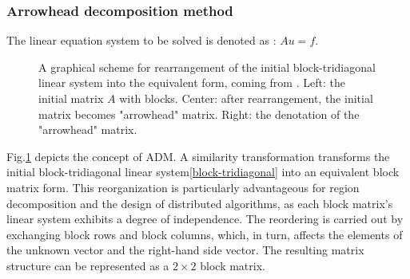 \subsubsection{Arrowhead decomposition method}
The linear equation system to be solved is denoted as : $Au = f$.
\begin{figure}[htb]
    \centering
    \caption{A graphical scheme for rearrangement of the initial block-tridiagonal linear system into the equivalent form, coming from \cite{arrowhead2017}. Left: the initial matrix $A$ with blocks. Center: after rearrangement, the initial matrix becomes "arrowhead" matrix. Right: the denotation of the "arrowhead" matrix.}
    \label{Schur Complement Method}
\end{figure}
Fig.\ref{Schur Complement Method} depicts the concept of ADM. A similarity transformation transforms the initial block-tridiagonal linear system\eqref{block-tridiagonal} into an equivalent block matrix form. This reorganization is particularly advantageous for region decomposition and the design of distributed algorithms, as each block matrix's linear system exhibits a degree of independence. The reordering is carried out by exchanging block rows and block columns, which, in turn, affects the elements of the unknown vector and the right-hand side vector. The resulting matrix structure can be represented as a $2 \times 2$ block matrix.

